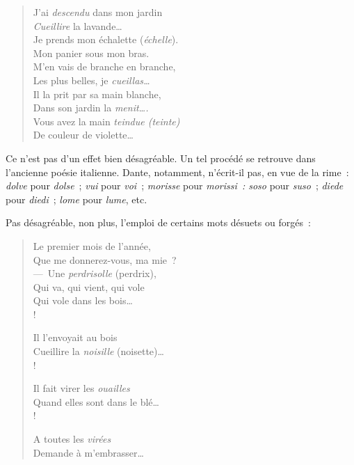 \documentclass[french,twoside]{book} %
\begin{document}
\begin{verse}
J’ai {\itshape descendu} dans mon jardin\\
{\itshape Cueillire} la lavande…\\
Je prends mon échalette ({\itshape échelle}).\\
Mon panier sous mon bras.\\
M’en vais de branche en branche,\\
Les plus belles, je {\itshape cueillas…}\\
Il la prit par sa main blanche,\\
Dans son jardin la {\itshape menit….}\\
Vous avez la main {\itshape teindue (teinte)}\\
De couleur de violette…\\
\end{verse}

\noindent Ce n’est pas d’un effet bien désagréable. Un tel procédé se retrouve dans l’ancienne poésie italienne. Dante, notamment, n’écrit-il pas, en vue de la rime : {\itshape dolve} pour {\itshape dolse} ; {\itshape vui} pour {\itshape voi} ; {\itshape morisse} pour {\itshape morissi : soso} pour {\itshape suso} ; {\itshape diede} pour {\itshape diedi} ; {\itshape lome} pour {\itshape lume}, etc.\par
Pas désagréable, non plus, l’emploi de certains mots désuets ou forgés :\par


\begin{verse}
Le premier mois de l’année,\\
Que me donnerez-vous, ma mie ?\\
— Une {\itshape perdrisolle} (perdrix),\\
Qui va, qui vient, qui vole\\
Qui vole dans les bois…\\!

Il l’envoyait au bois\\
Cueillire la {\itshape noisille} (noisette)…\\!

Il fait virer les {\itshape ouailles}\\
Quand elles sont dans le blé…\\!

A toutes les {\itshape virées}\\
Demande à m’embrasser…\\
\end{verse}
\end{document}
